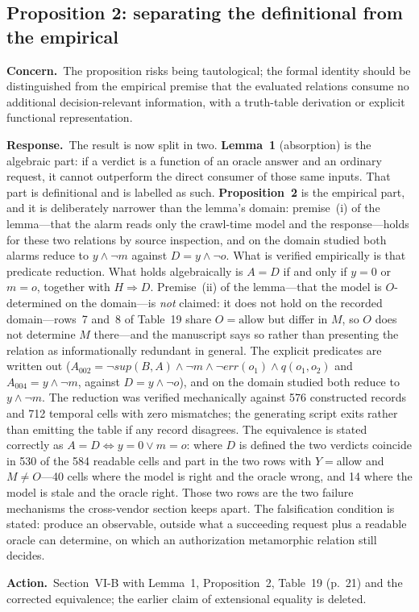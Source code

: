 \documentclass[10pt,letterpaper]{article}
\newcommand{\Concern}[1]{\par\smallskip\noindent\textbf{Concern.}\ #1\par}
\newcommand{\Response}[1]{\par\smallskip\noindent\textbf{Response.}\ #1\par}
\newcommand{\Action}[1]{\par\smallskip\noindent\textbf{Action.}\ #1\par}
\begin{document}
\subsection{Proposition 2: separating the definitional from the empirical}
\Concern{The proposition risks being tautological; the formal identity should be
distinguished from the empirical premise that the evaluated relations consume no
additional decision-relevant information, with a truth-table derivation or
explicit functional representation.}
\Response{The result is now split in two. \textbf{Lemma~1} (absorption) is the
algebraic part: if a verdict is a function of an oracle answer and an ordinary
request, it cannot outperform the direct consumer of those same inputs. That part
is definitional and is labelled as such. \textbf{Proposition~2} is the empirical
part, and it is deliberately narrower than the lemma's domain: premise~(i) of
the lemma---that the alarm reads only the crawl-time model and the
response---holds for these two relations by source inspection, and on the domain
studied both alarms reduce to $y\wedge\neg m$ against $D=y\wedge\neg o$. What is
verified empirically is that predicate reduction. What holds algebraically is
$A=D$ if and only if $y=0$ or $m=o$, together with $H\Rightarrow D$.
Premise~(ii) of the lemma---that the model is $O$-determined on the domain---is
\emph{not} claimed: it does not hold on the recorded domain---rows~7 and~8 of
Table~19 share $O=\mathrm{allow}$ but differ in $M$, so $O$ does not determine
$M$ there---and the
manuscript says so rather than presenting the relation as informationally
redundant in general. The explicit predicates are written out ($A_{002}=\neg sup(B,A)\wedge\neg m\wedge\neg err(o_1)\wedge
q(o_1,o_2)$ and $A_{004}=y\wedge\neg m$, against $D=y\wedge\neg o$), and on the
domain studied both reduce to $y\wedge\neg m$. The reduction was verified
mechanically against 576 constructed records and 712 temporal cells with zero
mismatches; the generating script exits rather than emitting the table if any
record disagrees. The equivalence is stated correctly as $A=D \Leftrightarrow
y=0 \vee m=o$: where $D$ is defined the two verdicts coincide in 530 of the 584
readable cells and part in the two rows with $Y{=}$allow and $M\neq O$---40 cells
where the model is right and the oracle wrong, and 14 where the model is stale
and the oracle right. Those two rows are the two failure mechanisms the
cross-vendor section keeps apart. The falsification condition is stated: produce
an observable, outside what a succeeding request plus a readable oracle can
determine, on which an authorization metamorphic relation still decides.}
\Action{Section~VI-B with Lemma~1, Proposition~2, Table~19 (p.~21) and the
corrected equivalence; the earlier claim of extensional equality is deleted.}
\end{document}
